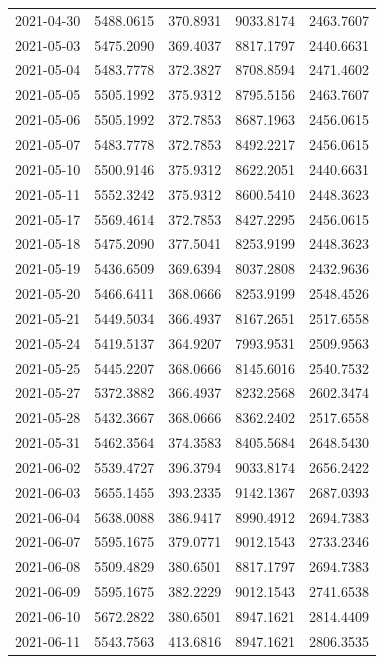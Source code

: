 {\begin{longtable}{lllll}
2021-04-30 & 5488.0615 & 370.8931 & 9033.8174 & 2463.7607 \\
2021-05-03 & 5475.2090 & 369.4037 & 8817.1797 & 2440.6631 \\
2021-05-04 & 5483.7778 & 372.3827 & 8708.8594 & 2471.4602 \\
2021-05-05 & 5505.1992 & 375.9312 & 8795.5156 & 2463.7607 \\
2021-05-06 & 5505.1992 & 372.7853 & 8687.1963 & 2456.0615 \\
2021-05-07 & 5483.7778 & 372.7853 & 8492.2217 & 2456.0615 \\
2021-05-10 & 5500.9146 & 375.9312 & 8622.2051 & 2440.6631 \\
2021-05-11 & 5552.3242 & 375.9312 & 8600.5410 & 2448.3623 \\
2021-05-17 & 5569.4614 & 372.7853 & 8427.2295 & 2456.0615 \\
2021-05-18 & 5475.2090 & 377.5041 & 8253.9199 & 2448.3623 \\
2021-05-19 & 5436.6509 & 369.6394 & 8037.2808 & 2432.9636 \\
2021-05-20 & 5466.6411 & 368.0666 & 8253.9199 & 2548.4526 \\
2021-05-21 & 5449.5034 & 366.4937 & 8167.2651 & 2517.6558 \\
2021-05-24 & 5419.5137 & 364.9207 & 7993.9531 & 2509.9563 \\
2021-05-25 & 5445.2207 & 368.0666 & 8145.6016 & 2540.7532 \\
2021-05-27 & 5372.3882 & 366.4937 & 8232.2568 & 2602.3474 \\
2021-05-28 & 5432.3667 & 368.0666 & 8362.2402 & 2517.6558 \\
2021-05-31 & 5462.3564 & 374.3583 & 8405.5684 & 2648.5430 \\
2021-06-02 & 5539.4727 & 396.3794 & 9033.8174 & 2656.2422 \\
2021-06-03 & 5655.1455 & 393.2335 & 9142.1367 & 2687.0393 \\
2021-06-04 & 5638.0088 & 386.9417 & 8990.4912 & 2694.7383 \\
2021-06-07 & 5595.1675 & 379.0771 & 9012.1543 & 2733.2346 \\
2021-06-08 & 5509.4829 & 380.6501 & 8817.1797 & 2694.7383 \\
2021-06-09 & 5595.1675 & 382.2229 & 9012.1543 & 2741.6538 \\
2021-06-10 & 5672.2822 & 380.6501 & 8947.1621 & 2814.4409 \\
2021-06-11 & 5543.7563 & 413.6816 & 8947.1621 & 2806.3535 \\

\end{longtable}}
